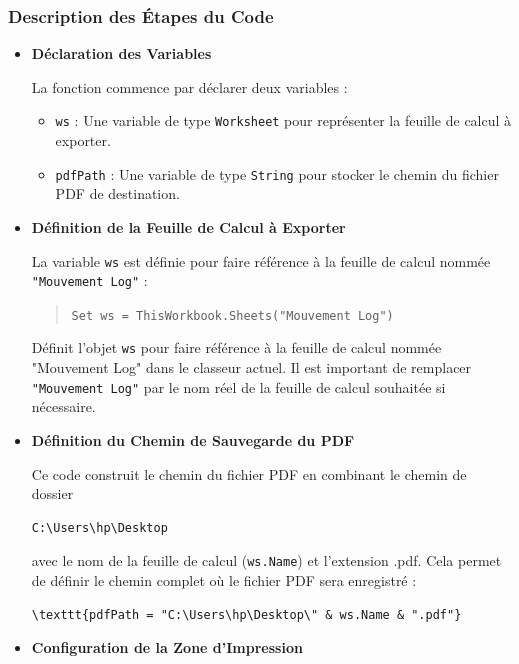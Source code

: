 \documentclass[a4paper, oneside, 12pt, final]{extreport}
\begin{document}
\subsubsection{Description des Étapes du Code}
\begin{itemize}

\item \textbf{Déclaration des Variables}

La fonction commence par déclarer deux variables :

\begin{itemize}
    \item \texttt{ws} : Une variable de type \texttt{Worksheet} pour représenter la feuille de calcul à exporter.
    \item \texttt{pdfPath} : Une variable de type \texttt{String} pour stocker le chemin du fichier PDF de destination.
\end{itemize}

\item \textbf{Définition de la Feuille de Calcul à Exporter}

La variable \texttt{ws} est définie pour faire référence à la feuille de calcul nommée \texttt{"Mouvement Log"} :

\begin{quote}
\texttt{Set ws = ThisWorkbook.Sheets("Mouvement Log")}
\end{quote}

Définit l'objet \texttt{ws} pour faire référence à la feuille de calcul nommée "Mouvement Log" dans le classeur actuel. Il est important de remplacer \texttt{"Mouvement Log"} par le nom réel de la feuille de calcul souhaitée si nécessaire.

\item \textbf{Définition du Chemin de Sauvegarde du PDF}

Ce code construit le chemin du fichier PDF en combinant le chemin de dossier \begin{verbatim}C:\Users\hp\Desktop\end{verbatim} avec le nom de la feuille de calcul (\texttt{ws.Name}) et l'extension .pdf. Cela permet de définir le chemin complet où le fichier PDF sera enregistré :

\begin{lstlisting}
\texttt{pdfPath = "C:\Users\hp\Desktop\" & ws.Name & ".pdf"}
\end{lstlisting}

\item \textbf{Configuration de la Zone d'Impression}


\end{itemize}
\end{document}

